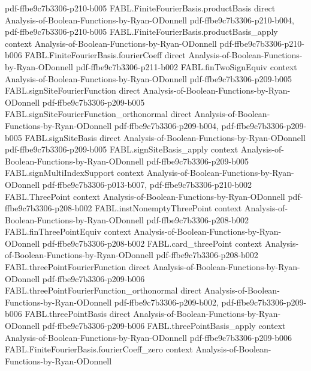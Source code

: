\begin{theorem}
  {pdf-ffbe9c7b3306-p210-b005}
\proofstep
  {FABL.FiniteFourierBasis.productBasis}
  {direct}
  {Analysis-of-Boolean-Functions-by-Ryan-ODonnell}
  {pdf-ffbe9c7b3306-p210-b004,
    pdf-ffbe9c7b3306-p210-b005}
\proofstep
  {FABL.FiniteFourierBasis.productBasis_apply}
  {context}
  {Analysis-of-Boolean-Functions-by-Ryan-ODonnell}
  {pdf-ffbe9c7b3306-p210-b006}
\proofstep
  {FABL.FiniteFourierBasis.fourierCoeff}
  {direct}
  {Analysis-of-Boolean-Functions-by-Ryan-ODonnell}
  {pdf-ffbe9c7b3306-p211-b002}
\proofstep
  {FABL.finTwoSignEquiv}
  {context}
  {Analysis-of-Boolean-Functions-by-Ryan-ODonnell}
  {pdf-ffbe9c7b3306-p209-b005}
\proofstep
  {FABL.signSiteFourierFunction}
  {direct}
  {Analysis-of-Boolean-Functions-by-Ryan-ODonnell}
  {pdf-ffbe9c7b3306-p209-b005}
\proofstep
  {FABL.signSiteFourierFunction_orthonormal}
  {direct}
  {Analysis-of-Boolean-Functions-by-Ryan-ODonnell}
  {pdf-ffbe9c7b3306-p209-b004,
    pdf-ffbe9c7b3306-p209-b005}
\proofstep
  {FABL.signSiteBasis}
  {direct}
  {Analysis-of-Boolean-Functions-by-Ryan-ODonnell}
  {pdf-ffbe9c7b3306-p209-b005}
\proofstep
  {FABL.signSiteBasis_apply}
  {context}
  {Analysis-of-Boolean-Functions-by-Ryan-ODonnell}
  {pdf-ffbe9c7b3306-p209-b005}
\proofstep
  {FABL.signMultiIndexSupport}
  {context}
  {Analysis-of-Boolean-Functions-by-Ryan-ODonnell}
  {pdf-ffbe9c7b3306-p013-b007,
    pdf-ffbe9c7b3306-p210-b002}
\proofstep
  {FABL.ThreePoint}
  {context}
  {Analysis-of-Boolean-Functions-by-Ryan-ODonnell}
  {pdf-ffbe9c7b3306-p208-b002}
\proofstep
  {FABL.instNonemptyThreePoint}
  {context}
  {Analysis-of-Boolean-Functions-by-Ryan-ODonnell}
  {pdf-ffbe9c7b3306-p208-b002}
\proofstep
  {FABL.finThreePointEquiv}
  {context}
  {Analysis-of-Boolean-Functions-by-Ryan-ODonnell}
  {pdf-ffbe9c7b3306-p208-b002}
\proofstep
  {FABL.card_threePoint}
  {context}
  {Analysis-of-Boolean-Functions-by-Ryan-ODonnell}
  {pdf-ffbe9c7b3306-p208-b002}
\proofstep
  {FABL.threePointFourierFunction}
  {direct}
  {Analysis-of-Boolean-Functions-by-Ryan-ODonnell}
  {pdf-ffbe9c7b3306-p209-b006}
\proofstep
  {FABL.threePointFourierFunction_orthonormal}
  {direct}
  {Analysis-of-Boolean-Functions-by-Ryan-ODonnell}
  {pdf-ffbe9c7b3306-p209-b002,
    pdf-ffbe9c7b3306-p209-b006}
\proofstep
  {FABL.threePointBasis}
  {direct}
  {Analysis-of-Boolean-Functions-by-Ryan-ODonnell}
  {pdf-ffbe9c7b3306-p209-b006}
\proofstep
  {FABL.threePointBasis_apply}
  {context}
  {Analysis-of-Boolean-Functions-by-Ryan-ODonnell}
  {pdf-ffbe9c7b3306-p209-b006}
\proofstep
  {FABL.FiniteFourierBasis.fourierCoeff_zero}
  {context}
  {Analysis-of-Boolean-Functions-by-Ryan-ODonnell}

\end{theorem}
